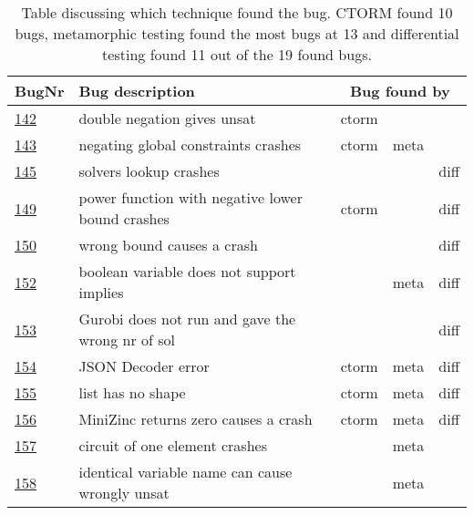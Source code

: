 \begin{table}[]
	\centering
	\caption{Table discussing which technique found the bug. CTORM found 10 bugs, metamorphic testing found the most bugs at 13 and differential testing found 11 out of the 19 found bugs.}
	\label{tab:bug:Technique}
	\begin{tabular}{lllll}
		\hline
		BugNr & Bug description                                           & \multicolumn{3}{c}{\centering  Bug found by} \\ \toprule
		\href{https://github.com/CPMpy/cpmpy/issues/142}{142} & double negation gives unsat                            & ctorm &       &      \\
		\href{https://github.com/CPMpy/cpmpy/issues/143}{143} & negating global constraints crashes                 & ctorm & meta  &      \\
		\href{https://github.com/CPMpy/cpmpy/issues/145}{145} & solvers lookup crashes                            &       &       & diff \\
		\href{https://github.com/CPMpy/cpmpy/issues/149}{149} & power function with negative lower bound crashes  & ctorm &       & diff \\
		\href{https://github.com/CPMpy/cpmpy/issues/150}{150} & wrong bound causes a crash                  &       &       & diff \\
		\href{https://github.com/CPMpy/cpmpy/issues/152}{152} & boolean variable does not support implies         &       & meta  & diff \\
		\href{https://github.com/CPMpy/cpmpy/issues/153}{153} & Gurobi does not run and gave the wrong nr of sol  &       &       & diff \\
		\href{https://github.com/CPMpy/cpmpy/issues/154}{154} & JSON Decoder error                                & ctorm & meta  & diff \\
		\href{https://github.com/CPMpy/cpmpy/issues/155}{155} & list has no shape                                 & ctorm & meta  & diff \\
		\href{https://github.com/CPMpy/cpmpy/issues/156}{156} & MiniZinc returns zero causes a crash              & ctorm & meta  & diff \\
		\href{https://github.com/CPMpy/cpmpy/issues/157}{157} & circuit of one element crashes                    &       & meta  &      \\
		\href{https://github.com/CPMpy/cpmpy/issues/158}{158} & identical variable name can cause wrongly unsat   &       & meta  &      \\

\end{tabular}
\end{table}
